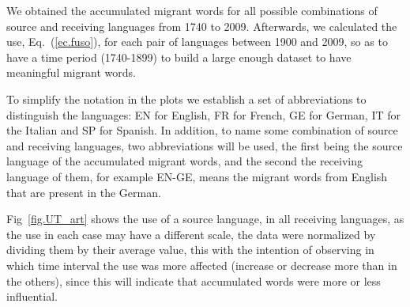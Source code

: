 \documentclass[10pt,letterpaper]{article} %
\newcommand{\eref}[1]{Eq.~(\ref{#1})}
\begin{document}
We obtained the accumulated migrant words for all
possible combinations of source and receiving languages from
1740 to 2009. 
Afterwards, we calculated the use, \eref{ec.fuso},  for each pair of languages between 1900 and
2009, so as to have a time period (1740-1899) to build a large enough dataset 
to have meaningful migrant words. 


% 
To simplify the notation in the plots we establish a set of abbreviations to
distinguish the languages: EN for English, FR for French, GE for German, IT for
the Italian and SP for Spanish. In addition, to name some combination of source
and receiving languages, two abbreviations will be used, the first being the
source language of the accumulated migrant words, and the second the receiving
language of them, for example EN-GE, means the migrant words from English that
are present in the German.



Fig~\ref{fig.UT_art} shows the use of a source language, in all receiving
languages, as the use in each case may have a different scale, the data were
normalized by dividing them by their average value, this with the intention of
observing in which time interval the use was more affected (increase or
decrease more than in the others), since this will indicate that accumulated
words were more or less influential. 
\end{document}
